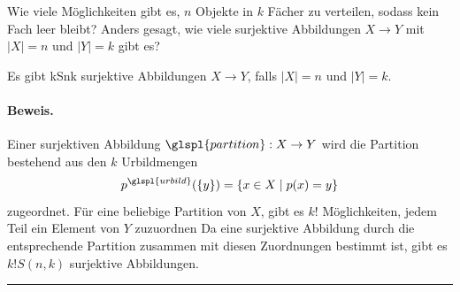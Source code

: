 \documentclass[9pt]{article}
\begin{document}
\begin{prob}
Wie viele Möglichkeiten gibt es, \( n \) Objekte in \( k \) Fächer zu verteilen, sodass kein Fach leer bleibt? Anders gesagt, wie viele surjektive Abbildungen \( X \to Y \) mit \( |X| = n \) und \( |Y| = k \) gibt es?
\end{prob}


\begin{satz}
Es gibt \gls{kSnk} surjektive Abbildungen \( X \to Y \), falls \( |X| = n \) und \( |Y| = k \).

\paragraph{Beweis.} Einer surjektiven Abbildung \(\glspl{partition} : X \to Y \) wird die Partition bestehend aus den \( k \) Urbildmengen
\[
p^{\glspl{urbild}}(\{y\}) = \{x \in X \mid p(x) = y\}
\]
zugeordnet. Für eine beliebige Partition von \( X \), gibt es \( k! \) Möglichkeiten, jedem Teil ein Element von \( Y \) zuzuordnen Da eine surjektive Abbildung durch die entsprechende Partition zusammen mit diesen Zuordnungen bestimmt ist, gibt es \( k! S(n, k) \) surjektive Abbildungen.  
 \end{satz} \noindent \rule{8cm}{0.4pt}
\end{document}
